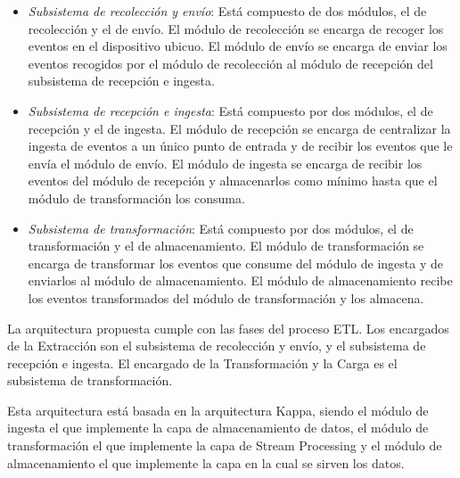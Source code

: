 \begin{itemize}
	\item \textit{Subsistema de recolección y envío}: Está compuesto de dos módulos, el de recolección y el de envío. El módulo de recolección se encarga de recoger los eventos en el dispositivo ubicuo. El módulo de envío se encarga de enviar los eventos recogidos por el módulo de recolección al módulo de recepción del subsistema de recepción e ingesta.
	
	\item \textit{Subsistema de recepción e ingesta}: Está compuesto por dos módulos, el de recepción y el de ingesta. El módulo de recepción se encarga de centralizar la ingesta de eventos a un único punto de entrada y  de recibir los eventos que le envía el módulo de envío. El módulo de ingesta se encarga de recibir los eventos del módulo de recepción y almacenarlos como mínimo hasta que el módulo de transformación los consuma.

	\item \textit{Subsistema de transformación}:  Está compuesto por dos módulos, el de transformación y el de almacenamiento. El módulo de transformación se encarga de transformar los eventos que consume del módulo de ingesta y de enviarlos al módulo de almacenamiento. El módulo de almacenamiento recibe los eventos transformados del módulo de transformación y los almacena.
\end{itemize}

La arquitectura propuesta cumple con las fases del proceso ETL. Los encargados de la Extracción son el subsistema de recolección y envío, y el subsistema de recepción e ingesta. El encargado de la Transformación y la Carga es el subsistema de transformación.

Esta arquitectura está basada en la arquitectura Kappa\cite{Tfg:kappa}, siendo el módulo de ingesta el que implemente la capa de almacenamiento de datos, el módulo de transformación el que implemente la capa de Stream Processing y el módulo de almacenamiento el que implemente la capa en la cual se sirven los datos.


